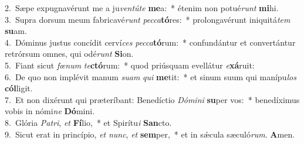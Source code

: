 {2.~}Sæpe expugnavérunt me a ju\textit{ven}\textit{tú}\textit{te} \textbf{me}a:~* étenim non potué\textit{runt} \textbf{mi}hi.\\
{3.~}Supra dorsum meum fabricavé\textit{runt} \textit{pec}\textit{ca}\textbf{tó}res:~* prolongavérunt iniquitá\textit{tem} \textbf{su}am.\\
{4.~}Dóminus justus concídit cerví\textit{ces} \textit{pec}\textit{ca}\textbf{tó}rum:~* confundántur et convertántur retrórsum omnes, qui odé\textit{runt} \textbf{Si}on.\\
{5.~}Fiant sicut \textit{fœ}\textit{num} \textit{te}\textbf{ctó}rum:~* quod priúsquam evellátur \textit{e}\textbf{xá}ruit:\\
{6.~}De quo non implévit manum \textit{su}\textit{am} \textit{qui} \textbf{me}tit:~* et sinum suum qui manípu\textit{los} \textbf{cól}ligit.\\
{7.~}Et non dixérunt qui præteríbant: Benedíctio \textit{Dó}\textit{mi}\textit{ni} \textbf{su}per vos:~* benedíximus vobis in nómi\textit{ne} \textbf{Dó}mini.\\
{8.~}Glória \textit{Pa}\textit{tri}, \textit{et} \textbf{Fí}lio,~* et Spirítu\textit{i} \textbf{San}cto.\\
{9.~}Sicut erat in princípio, \textit{et} \textit{nunc}, \textit{et} \textbf{sem}per,~* et in sǽcula sæculó\textit{rum}. \textbf{A}men.\\
